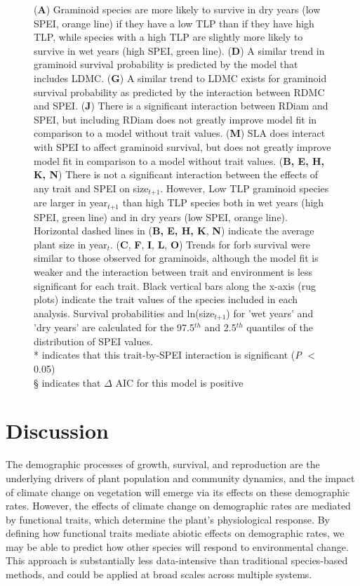 \documentclass[12pt, letterpaper]{article}
\begin{document}
\begin{figure}[h]
  \ContinuedFloat
  \caption{\internallinenumbers
(\textbf{A}) Graminoid species are more likely to survive in dry years (low SPEI, orange line) if they have a low TLP than if they have high TLP, while species with a high TLP are slightly more likely to survive in wet years (high SPEI, green line). 
(\textbf{D}) A similar trend in graminoid survival probability is predicted by the model that includes LDMC. 
(\textbf{G}) A similar trend to LDMC exists for graminoid survival probability as predicted by the interaction between RDMC and SPEI. 
(\textbf{J}) There is a significant interaction between RDiam and SPEI, but including RDiam does not greatly improve model fit in comparison to a model without trait values.
(\textbf{M}) SLA does interact with SPEI to affect graminoid survival, but does not greatly improve model fit in comparison to a model without trait values. 
(\textbf{B, E, H, K, N}) There is not a significant interaction between the effects of any trait and SPEI on size$_\textit{t+1}$. However, Low TLP graminoid species are larger in year$_\textit{t+1}$ than high TLP species both in wet years (high SPEI, green line) and in dry years (low SPEI, orange line). Horizontal dashed lines in (\textbf{B, E, H, K}, \textbf{N}) indicate the average plant size in year$_\textit{t}$. 
(\textbf{C}, \textbf{F}, \textbf{I}, \textbf{L}, \textbf{O}) Trends for forb survival were similar to those observed for graminoids, although the model fit is weaker and the interaction between trait and environment is less significant for each trait.
Black vertical bars along the x-axis (rug plots) indicate the trait values of the species included in each analysis. Survival probabilities and ln(size$_\textit{t+1}$) for 'wet years' and 'dry years' are calculated for the 97.5$^{th}$ and 2.5$^{th}$ quantiles of the distribution of SPEI values. \\
* indicates that this trait-by-SPEI interaction is significant (\textit{P} $<$ 0.05)\\
§ indicates that $\Delta$ AIC for this model is positive
}
 \label{fig:test}
\end{figure}
\section{Discussion}
The demographic processes of growth, survival, and reproduction are the underlying drivers of plant population and community dynamics, and the impact of climate change on vegetation will emerge via its effects on these demographic rates. However, the effects of climate change on demographic rates are mediated by functional traits, which determine the plant’s physiological response. By defining how functional traits mediate abiotic effects on demographic rates, we may be able to predict how other species will respond to environmental change. This approach is substantially less data-intensive than traditional species-based methods, and could be applied at broad scales across multiple systems. 
\end{document}
